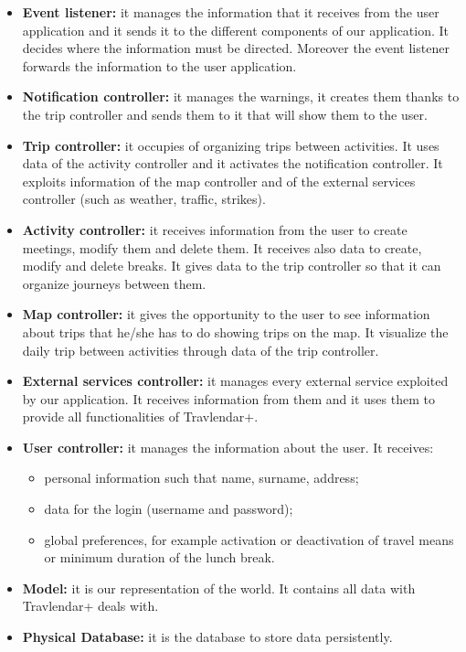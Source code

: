 \documentclass[12pt,titlepage]{article}
\begin{document}
\begin{flushleft}
\begin{itemize}
\item \textbf{Event listener:} it manages the information that it receives from the user application and it sends it to the different components of our application. It decides where the information must be directed. Moreover the event listener forwards the information to the user application.
\item \textbf{Notification controller:} it manages the warnings, it creates them thanks to the trip controller and sends them to it that will show them to the user.
\item \textbf{Trip controller:} it occupies of organizing trips between activities. It uses data of the activity controller and it activates the notification controller. It exploits information of the map controller and of the external services controller (such as weather, traffic, strikes).
\item \textbf{Activity controller:} it receives information from the user to create meetings, modify them and delete them. It receives also data to create, modify and delete breaks. It gives data to the trip controller so that it can organize journeys between them.
\item \textbf{Map controller:} it gives the opportunity to the user to see information about trips that he/she has to do showing trips on the map. It visualize the daily trip between activities through data of the trip controller.
\item \textbf{External services controller:} it manages every external service exploited by our application. It receives information from them and it uses them to provide all functionalities of Travlendar+.
\item \textbf{User controller:} it manages the information about the user. It receives:
\begin{itemize}
\item personal information such that name, surname, address;
\item data for the login (username and password);
\item global preferences, for example activation or deactivation of travel means or minimum duration of the lunch break.
\end{itemize} 
\item \textbf{Model:} it is our representation of the world. It contains all data with Travlendar+ deals with.
\item \textbf{Physical Database:} it is the database to store data persistently.

\end{itemize}
\end{flushleft}
\end{document}
